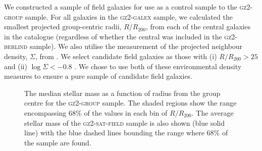 \documentclass[useAMS,usenatbib]{mn2e}
\begin{document}
We constructed a sample of field galaxies for use as a control sample to the \textsc{gz2-group} sample. For all galaxies in the \textsc{gz2-galex} sample, we calculated the smallest projected group-centric radii, $R/R_{200}$, from each of the central galaxies in the \citet{berlind06} catalogue (regardless of whether the central was included in the \textsc{gz2-berlind} sample). We also utilise the measurement of the projected neighbour density, $\Sigma$, from \cite{Baldry06}. We select candidate field galaxies as those with (i) $R/R_{200} > 25$ and (ii) $\log\Sigma < -0.8$ \citep[the threshold on the local environment density which selects field galaxies as defined by][]{Baldry06}. We chose to use both of these environmental density measures to ensure a pure sample of candidate field galaxies.

\begin{figure}
\caption[Average mass with group radius in the \textsc{gz2-group} sample]{The median stellar mass as a function of radius from the group centre for the \textsc{gz2-group} sample. The shaded regions show the range encompassing $68\%$ of the values in each bin of $R/R_{200}$. The average stellar mass of the \textsc{gz2-sat-field} sample is also shown (blue solid line) with the blue dashed lines bounding the range where $68\%$ of the sample are found.}
\label{fig:massdep}
\end{figure}
\end{document}
